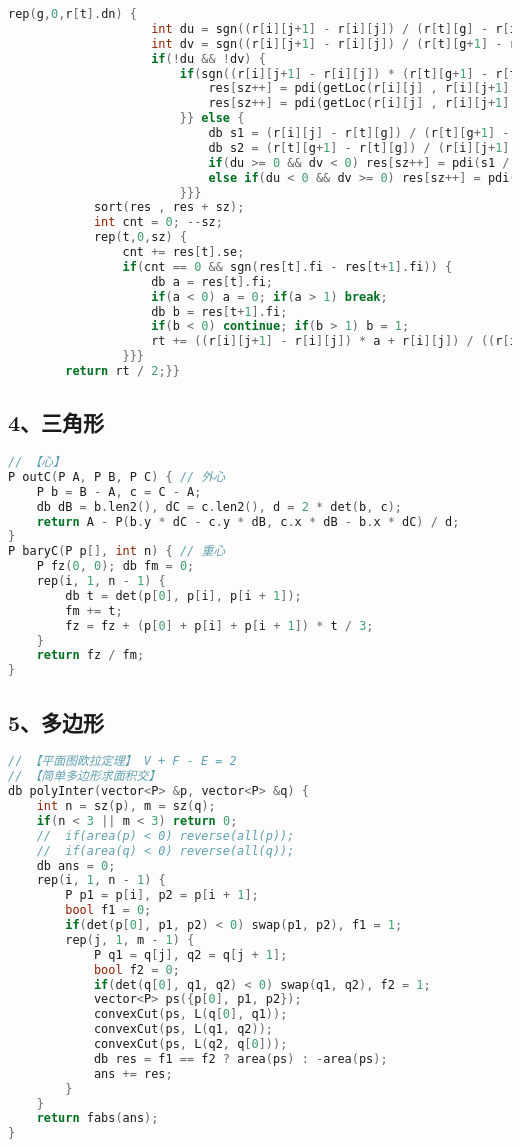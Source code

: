 \begin{lstlisting}[language=C++]
				rep(g,0,r[t].dn) {
					int du = sgn((r[i][j+1] - r[i][j]) / (r[t][g] - r[i][j]));
					int dv = sgn((r[i][j+1] - r[i][j]) / (r[t][g+1] - r[i][j]));
					if(!du && !dv) {
						if(sgn((r[i][j+1] - r[i][j]) * (r[t][g+1] - r[t][g])) < 0 || i < t){
							res[sz++] = pdi(getLoc(r[i][j] , r[i][j+1] , r[t][g]) , 1);
							res[sz++] = pdi(getLoc(r[i][j] , r[i][j+1] , r[t][g+1]) , -1);
						}} else {
							db s1 = (r[i][j] - r[t][g]) / (r[t][g+1] - r[t][g]);
							db s2 = (r[t][g+1] - r[t][g]) / (r[i][j+1] - r[t][g]);
							if(du >= 0 && dv < 0) res[sz++] = pdi(s1 / (s1 + s2) , 1);
							else if(du < 0 && dv >= 0) res[sz++] = pdi(s1 / (s1 + s2) , -1);
						}}}
			sort(res , res + sz);
			int cnt = 0; --sz;
			rep(t,0,sz) {
				cnt += res[t].se;
				if(cnt == 0 && sgn(res[t].fi - res[t+1].fi)) {
					db a = res[t].fi;
					if(a < 0) a = 0; if(a > 1) break;
					db b = res[t+1].fi;
					if(b < 0) continue; if(b > 1) b = 1;
					rt += ((r[i][j+1] - r[i][j]) * a + r[i][j]) / ((r[i][j+1]-r[i][j]) * b + r[i][j]);
				}}}
		return rt / 2;}}
\end{lstlisting}
\subsection{4、三角形}
\begin{lstlisting}[language=C++]
// 【心】
P outC(P A, P B, P C) { // 外心
	P b = B - A, c = C - A;
	db dB = b.len2(), dC = c.len2(), d = 2 * det(b, c);
	return A - P(b.y * dC - c.y * dB, c.x * dB - b.x * dC) / d;
}
P baryC(P p[], int n) { // 重心
	P fz(0, 0); db fm = 0;
	rep(i, 1, n - 1) {
		db t = det(p[0], p[i], p[i + 1]);
		fm += t;
		fz = fz + (p[0] + p[i] + p[i + 1]) * t / 3;
	}
	return fz / fm;
}
\end{lstlisting}
\subsection{5、多边形}
\begin{lstlisting}[language=C++]
// 【平面图欧拉定理】 V + F - E = 2
// 【简单多边形求面积交】
db polyInter(vector<P> &p, vector<P> &q) {
	int n = sz(p), m = sz(q);
	if(n < 3 || m < 3) return 0;
	//	if(area(p) < 0) reverse(all(p));
	//	if(area(q) < 0) reverse(all(q));
	db ans = 0;
	rep(i, 1, n - 1) {
		P p1 = p[i], p2 = p[i + 1];
		bool f1 = 0;
		if(det(p[0], p1, p2) < 0) swap(p1, p2), f1 = 1;
		rep(j, 1, m - 1) {
			P q1 = q[j], q2 = q[j + 1];
			bool f2 = 0;
			if(det(q[0], q1, q2) < 0) swap(q1, q2), f2 = 1;
			vector<P> ps({p[0], p1, p2});
			convexCut(ps, L(q[0], q1));
			convexCut(ps, L(q1, q2));
			convexCut(ps, L(q2, q[0]));
			db res = f1 == f2 ? area(ps) : -area(ps);
			ans += res;
		}
	}
	return fabs(ans);
}
\end{lstlisting}
